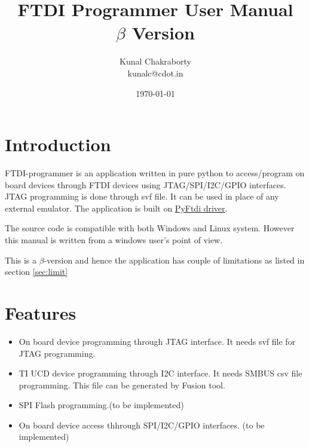 \documentclass[a4paper,12pt]{report}%
\title{FTDI Programmer User Manual \\ $\beta$ Version}
\date{\today}
\author{Kunal Chakraborty \\kunalc@cdot.in}
\begin{document}
\maketitle
\tableofcontents



\section{Introduction}\label{intro}	%



FTDI-programmer is an application written in pure python to access/program on board devices through FTDI devices 
using JTAG/SPI/I2C/GPIO interfaces. JTAG programming is done through svf file. It can be used in place of any 
external emulator. The application is built on \href{https://github.com/eblot/pyftdi}{PyFtdi driver}.



The source code is compatible with both Windows and Linux system. However this manual is written from a windows 
user's point of view.


This is a $\beta$-version and hence the application has couple of limitations as listed in section \ref{sec:limit} 

	

\section{Features}
\begin{itemize}
	\item
	On board device programming through JTAG interface. It needs svf file for JTAG programming.
	
	\item
	TI UCD device programming through I2C interface. It needs SMBUS csv file programming. This file can be
	generated by Fusion tool.
	
	\item
	SPI Flash programming.(to be implemented)
	
	\item
	On board device access thhrough SPI/I2C/GPIO interfaces. (to be implemented)

\end{itemize}	

	
\end{document}
